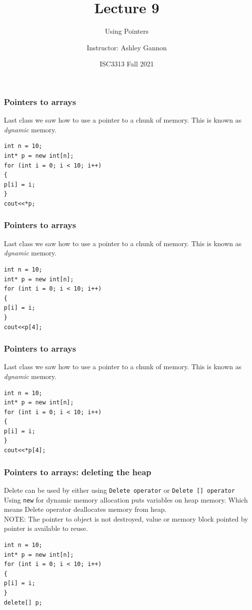 \documentclass{if-beamer}
\title[Lecture 9]{Lecture 9}
\subtitle{Using Pointers}
\author{Instructor: Ashley Gannon}
\date{ISC3313 Fall 2021}
\begin{document}
	
\begin{frame}
	\titlepage
\end{frame}


\begin{frame}[fragile]
\frametitle{Pointers to arrays}
Last class we saw how to use a pointer to a chunk of memory. This is known as
\textit{dynamic} memory.
\begin{lstlisting}
int n = 10;
int* p = new int[n];
for (int i = 0; i < 10; i++)
{
p[i] = i;
}
cout<<*p;
\end{lstlisting}
\end{frame}

\begin{frame}[fragile]
\frametitle{Pointers to arrays}
Last class we saw how to use a pointer to a chunk of memory. This is known as
\textit{dynamic} memory.
\begin{lstlisting}
int n = 10;
int* p = new int[n];
for (int i = 0; i < 10; i++)
{
p[i] = i;
}
cout<<p[4];
\end{lstlisting}
\end{frame}

\begin{frame}[fragile]
\frametitle{Pointers to arrays}
Last class we saw how to use a pointer to a chunk of memory. This is known as
\textit{dynamic} memory.
\begin{lstlisting}
int n = 10;
int* p = new int[n];
for (int i = 0; i < 10; i++)
{
p[i] = i;
}
cout<<*p[4];
\end{lstlisting}
\end{frame}

\begin{frame}[fragile]
\frametitle{Pointers to arrays: deleting the heap}
Delete can be used by either using \texttt{Delete operator} or \texttt{Delete [] operator} \\
\vspace{5pt}
Using \texttt{new} for dynamic memory allocation puts variables on heap memory. Which means Delete operator deallocates memory from heap.\\
\vspace{5pt}
NOTE: The pointer to object is not destroyed, value or memory block pointed by pointer is available to reuse.

\begin{lstlisting}
int n = 10;
int* p = new int[n];
for (int i = 0; i < 10; i++)
{
p[i] = i;
}
delete[] p;
\end{lstlisting}
\end{frame}
\end{document}
